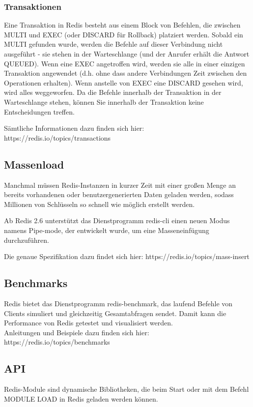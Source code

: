 \subsubsection{Transaktionen}
Eine Transaktion in Redis besteht aus einem Block von Befehlen, die zwischen MULTI und EXEC (oder DISCARD für Rollback) platziert werden. Sobald ein MULTI gefunden wurde, werden die Befehle auf dieser Verbindung nicht ausgeführt - sie stehen in der Warteschlange (und der Anrufer erhält die Antwort QUEUED). Wenn eine EXEC angetroffen wird, werden sie alle in einer einzigen Transaktion angewendet (d.h. ohne dass andere Verbindungen Zeit zwischen den Operationen erhalten). Wenn anstelle von EXEC eine DISCARD gesehen wird, wird alles weggeworfen. Da die Befehle innerhalb der Transaktion in der Warteschlange stehen, können Sie innerhalb der Transaktion keine Entscheidungen treffen.

Sämtliche Informationen dazu finden sich hier: https://redis.io/topics/transactions

\subsection{Massenload}
Manchmal müssen Redis-Instanzen in kurzer Zeit mit einer großen Menge an bereits vorhandenen oder benutzergenerierten Daten geladen werden, sodass Millionen von Schlüsseln so schnell wie möglich erstellt werden.

Ab Redis 2.6 unterstützt das Dienstprogramm redis-cli einen neuen Modus namens Pipe-mode, der entwickelt wurde, um eine Masseneinfügung durchzuführen.

Die genaue Spezifikation dazu findet sich hier: https://redis.io/topics/mass-insert

\subsection{Benchmarks}
Redis bietet das Dienstprogramm redis-benchmark, das laufend Befehle von Clients simuliert und gleichzeitig Gesamtabfragen sendet. Damit kann die Performance von Redis getestet und visualisiert werden.\\
Anleitungen und Beispiele dazu finden sich hier: https://redis.io/topics/benchmarks

\subsection{API}
Redis-Module sind dynamische Bibliotheken, die beim Start oder mit dem Befehl MODULE LOAD in Redis geladen werden können.

